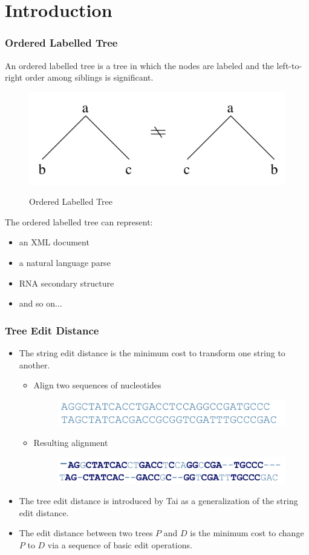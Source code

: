 \documentclass{beamer}
\begin{document}
\section{Introduction}
\begin{frame}
\frametitle{Ordered Labelled Tree }
An ordered labelled tree is a tree in which the nodes are labeled and the left-to-right order among siblings is significant. 
\begin{figure}
	\includegraphics[width=0.6\linewidth]{OrderedLabelledTree}
	\label{Ordered Labelled Tree} 
	\caption{Ordered Labelled Tree}
	\centering
\end{figure}
The ordered labelled tree can represent:
\begin{itemize}
\item an XML document
\item a natural language parse 
\item RNA secondary structure
\item and so on...
\end{itemize}
\end{frame}
\begin{frame}
\frametitle{Tree Edit Distance}
\begin{itemize}
\item The string edit distance is the minimum cost to transform one string to another.
\begin{itemize}
\item Align two sequences of nucleotides
\begin{figure}
	\includegraphics[width=0.8\linewidth]{Sequence}
\end{figure}
\item Resulting alignment
\begin{figure}
	\includegraphics[width=0.8\linewidth]{SequenceAfterAlign}
\end{figure}
\end{itemize}
\item The tree edit distance is introduced by Tai as a generalization of the string edit distance. 
\item The edit distance between two trees  $P$  and $D$  is the minimum cost to change $P $ to $D$  via a sequence of basic edit operations.
\end{itemize}
\end{frame}
\end{document}
